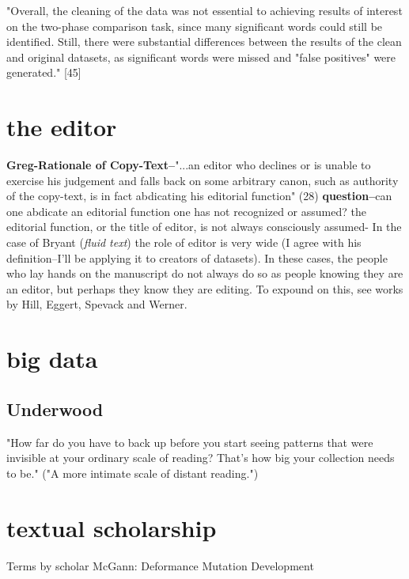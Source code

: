 \documentclass[course, english]{Notes}
\begin{document}
 "Overall, the cleaning of the data was not essential to achieving results of interest on the two-phase comparison task, since many significant words could still be identified. Still, there were substantial differences between the results of the clean and original datasets, as significant words were missed and "false positives" were generated." [45]

\section{the editor}
\begin{outline}
\1 \textbf{Greg-Rationale of Copy-Text--}"...an editor who declines or is unable to exercise his judgement and falls back on some arbitrary canon, such as authority of the copy-text, is in fact abdicating his editorial function" (28)
	\2 \textbf{question--}can one abdicate an editorial function one has not recognized or assumed?
	\2 the editorial function, or the title of editor, is not always consciously assumed- In the case of Bryant (\textit{fluid text}) the role of editor is very wide (I agree with his definition--I'll be applying it to creators of datasets). In these cases, the people who lay hands on the manuscript do not always do so as people knowing they are an editor, but perhaps they know they are editing. 
		\3 To expound on this, see works by Hill, Eggert, Spevack and Werner. 
		

\end{outline}


\section{big data}

\subsection{Underwood}
 "How far do you have to back up before you start seeing patterns that were invisible at your ordinary scale of reading? That’s how big your collection needs to be." 
("A more intimate scale of distant reading.")
	
	
	
	
	
	
\section{textual scholarship}
Terms by scholar
McGann:
	Deformance
	Mutation
	Development
	
\end{document}
